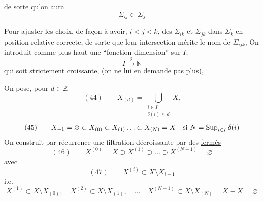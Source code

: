 de sorte qu'on aura
\[
\Sigma_{ij}\subset\Sigma_j
\]

Pour ajuster les choix, de façon à avoir,
$i<j<k$, des $\Sigma_{ik}$ et $\Sigma_{jk}$ dans $\Sigma_k$ en
position relative correcte, de sorte que leur intersection
mérite le nom de $\Sigma_{ijk}$,
On introduit comme plus haut une ``fonction dimension'' sur $I$;
\[
I\xrightarrow{\delta}\mathbb N
\]
qui soit \uline{strictement croissante}, 
(on ne lui en demande pas plus),

On pose, pour $d\in\mathbb Z$
\[
(44)\qquad X_{(d)}=\bigcup_{\substack{i\in I\\\delta(i)\leq d}}X_i
\]
\[
(45)\qquad X_{-1}=\varnothing\subset X_{(0)}\subset X_{(1)}\ldots
\subset X_{(N)}=X\quad\hbox{si }N=\operatorname{Sup}_{i\in I}\delta(i)
\]
On construit par récurrence une filtration décroissante par des
\uline{fermés}
\[
(46)\qquad X^{(0)}=X\supset X^{(1)}\supset\ldots\supset X^{(N+1)}=\varnothing
\]
avec
\[
(47)\qquad X^{(i)}\subset X\setminus X_{i-1}
\]
i.e.
\[
X^{(1)}\subset X\setminus X_{(0)},\quad
X^{(2)}\subset X\setminus X_{(1)},\quad\ldots\quad
X^{(N+1)}\subset X\setminus X_{(N)}=X-X=\varnothing
\]
